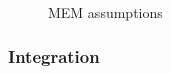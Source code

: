 \begin{figure}
\begin{centering}
\\
\caption{\fixme MEM assumptions}
\label{fig:mem_assumptions}
\end{centering}
\end{figure}

\subsubsection{Integration}
\label{sec:mem_integration}


